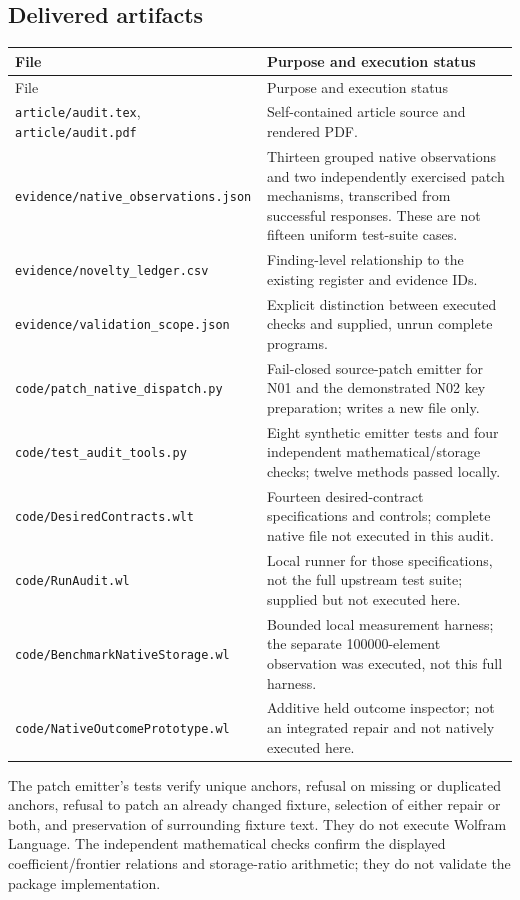 \documentclass[11pt]{article}
\begin{document}
\subsection{Delivered artifacts}
\begin{longtable}{@{}p{}p{}@{}}
\toprule File & Purpose and execution status \\
\midrule\endfirsthead
\toprule File & Purpose and execution status \\
\midrule\endhead
\nolinkurl{article/audit.tex}, \nolinkurl{article/audit.pdf} & Self-contained article source and rendered PDF. \\
\nolinkurl{evidence/native_observations.json} & Thirteen grouped native observations and two independently exercised patch mechanisms, transcribed from successful responses. These are not fifteen uniform test-suite cases. \\
\nolinkurl{evidence/novelty_ledger.csv} & Finding-level relationship to the existing register and evidence IDs. \\
\nolinkurl{evidence/validation_scope.json} & Explicit distinction between executed checks and supplied, unrun complete programs. \\
\nolinkurl{code/patch_native_dispatch.py} & Fail-closed source-patch emitter for N01 and the demonstrated N02 key preparation; writes a new file only. \\
\nolinkurl{code/test_audit_tools.py} & Eight synthetic emitter tests and four independent mathematical/storage checks; twelve methods passed locally. \\
\nolinkurl{code/DesiredContracts.wlt} & Fourteen desired-contract specifications and controls; complete native file not executed in this audit. \\
\nolinkurl{code/RunAudit.wl} & Local runner for those specifications, not the full upstream test suite; supplied but not executed here. \\
\nolinkurl{code/BenchmarkNativeStorage.wl} & Bounded local measurement harness; the separate 100000-element observation was executed, not this full harness. \\
\nolinkurl{code/NativeOutcomePrototype.wl} & Additive held outcome inspector; not an integrated repair and not natively executed here. \\
\bottomrule
\end{longtable}

The patch emitter's tests verify unique anchors, refusal on missing or duplicated anchors, refusal to patch an already changed fixture, selection of either repair or both, and preservation of surrounding fixture text. They do not execute Wolfram Language. The independent mathematical checks confirm the displayed coefficient/frontier relations and storage-ratio arithmetic; they do not validate the package implementation.
\end{document}
